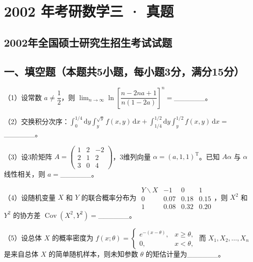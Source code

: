 \documentclass[UTF8,12pt]{ctexart}
\begin{document}
\section*{2002 年考研数学三 · 真题}
\subsection*{2002年全国硕士研究生招生考试试题}

\subsection*{一、填空题（本题共5小题，每小题3分，满分15分）}

（1）设常数 \(\displaystyle a\ne\dfrac{\displaystyle 1}{\displaystyle 2}\)，则 \(\displaystyle \lim_{n\to\infty}\ln\left[\dfrac{\displaystyle n-2na+1}{\displaystyle n(1-2a)}\right]^n=\)\_\_\_\_\_\_。


（2）交换积分次序：\(\displaystyle \int_0^{1/4}\mathrm dy\displaystyle \int_y^{\sqrt y}f(x,\allowbreak y)\,\mathrm dx+\displaystyle \int_{1/4}^{1/2}\mathrm dy\displaystyle \int_y^{1/2}f(x,\allowbreak y)\,\mathrm dx=\)\_\_\_\_\_\_。


（3）设3阶矩阵 \(\displaystyle A=\begin{pmatrix}1&2&-2\\2&1&2\\3&0&4\end{pmatrix}\)，3维列向量 \(\displaystyle \alpha=(a,\allowbreak 1,\allowbreak 1)^{\mathrm T}\)。已知 \(\displaystyle A\alpha\) 与 \(\displaystyle \alpha\) 线性相关，则 \(\displaystyle a=\)\_\_\_\_\_\_。


（4）设随机变量 \(\displaystyle X\) 和 \(\displaystyle Y\) 的联合概率分布为 \(\displaystyle \begin{array}{c|ccc}Y\backslash X&-1&0&1\\\hline 0&0.07&0.18&0.15\\1&0.08&0.32&0.20\end{array}\)，则 \(\displaystyle X^2\) 和 \(\displaystyle Y^2\) 的协方差 \(\displaystyle \operatorname{Cov}(X^2,\allowbreak Y^2)=\)\_\_\_\_\_\_。


（5）设总体 \(\displaystyle X\) 的概率密度为 \(\displaystyle f(x;\theta)=\begin{cases}e^{-(x-\theta)},\allowbreak &x\ge\theta,\allowbreak \\0,\allowbreak &x<\theta,\allowbreak \end{cases}\) 而 \(\displaystyle X_1,\allowbreak X_2,\allowbreak \ldots,\allowbreak X_n\) 是来自总体 \(\displaystyle X\) 的简单随机样本，则未知参数 \(\displaystyle \theta\) 的矩估计量为\_\_\_\_\_\_。
\end{document}

